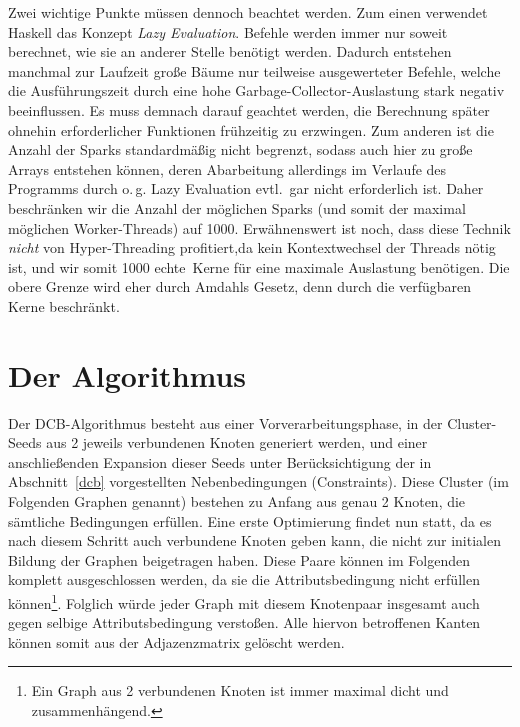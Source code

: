 \documentclass[a4paper]{scrartcl}
\newcommand{\en}[1]{\selectlanguage{USenglish}#1\selectlanguage{ngerman}}
\begin{document}
\medskip
Zwei wichtige Punkte müssen dennoch beachtet werden. Zum einen verwendet Haskell das Konzept \emph{\en{Lazy Evaluation}}. Befehle werden immer nur soweit berechnet, wie sie an anderer Stelle benötigt werden. Dadurch entstehen manchmal zur Laufzeit große Bäume nur teilweise ausgewerteter Befehle, welche die Ausführungszeit durch eine hohe Garbage-Collector-Auslastung stark negativ beeinflussen. Es muss demnach darauf geachtet werden, die Berechnung später ohnehin erforderlicher Funktionen frühzeitig zu erzwingen. Zum anderen ist die Anzahl der Sparks standardmäßig nicht begrenzt, sodass auch hier zu große Arrays entstehen können, deren Abarbeitung allerdings im Verlaufe des Programms durch o.\,g. Lazy Evaluation evtl.\ gar nicht erforderlich ist. Daher beschränken wir die Anzahl der möglichen Sparks (und somit der maximal möglichen Worker-Threads) auf 1000. Erwähnenswert ist noch, dass diese Technik \emph{nicht} von Hyper-Threading profitiert,da kein Kontextwechsel der Threads nötig ist, und wir somit 1000 \glqq echte\grqq \ Kerne für eine maximale Auslastung benötigen. Die obere Grenze wird eher durch Amdahls Gesetz, denn durch die verfügbaren Kerne beschränkt.\par


\section{Der Algorithmus}

Der DCB-Algorithmus besteht aus einer Vorverarbeitungsphase, in der Cluster-Seeds aus 2 jeweils verbundenen Knoten generiert werden, und einer anschließenden Expansion dieser Seeds unter Berücksichtigung der in Abschnitt~\ref{dcb} vorgestellten Nebenbedingungen (Constraints). Diese Cluster (im Folgenden Graphen genannt) bestehen zu Anfang aus genau 2 Knoten, die sämtliche Bedingungen erfüllen. Eine erste Optimierung findet nun statt, da es nach diesem Schritt auch verbundene Knoten geben kann, die nicht zur initialen Bildung der Graphen beigetragen haben. Diese Paare können im Folgenden komplett ausgeschlossen werden, da sie die Attributsbedingung nicht erfüllen können\footnote{Ein Graph aus 2 verbundenen Knoten ist immer maximal dicht und zusammenhängend.}. Folglich würde jeder Graph mit diesem Knotenpaar insgesamt auch gegen selbige Attributsbedingung verstoßen. Alle hiervon betroffenen Kanten können somit aus der Adjazenzmatrix gelöscht werden.\par
\end{document}
